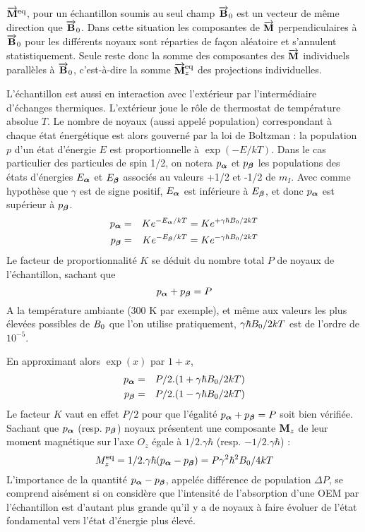 $\overrightarrow{\mathbf{M}}^{\mbox{\footnotesize{eq}}}$, pour un échantillon soumis
au seul champ $\overrightarrow{\mathbf{B}}_0$ est un vecteur de même
direction que $\overrightarrow{\mathbf{B}}_0$.
Dans cette situation les composantes de $\overrightarrow{\mathbf{M}}$
perpendiculaires à $\overrightarrow{\mathbf{B}}_0$ pour
les différents noyaux sont réparties de façon aléatoire et s'annulent statistiquement.
Seule reste donc la somme des composantes des $\overrightarrow{\mathbf{M}}$
individuels parallèles à $\overrightarrow{\mathbf{B}}_0$,
c'est-à-dire la somme $\overrightarrow{\mathbf{M}}^{\mbox{\footnotesize{eq}}}_z$ des projections individuelles.

L'échantillon est aussi en interaction avec l'extérieur par l'intermédiaire
d'échanges thermiques.
L'extérieur joue le rôle de thermostat de température absolue $T$.
Le nombre de noyaux (aussi appelé population) correspondant à chaque état
énergétique est alors gouverné par la loi de Boltzman :
la population $p$ d'un état d'énergie $E$ est proportionnelle à $\exp(-E/kT)$.
Dans le cas particulier des particules de spin 1/2,
on notera $p_{\boldsymbol{\alpha}}$ et $p_{\boldsymbol{\beta}}$ les populations des états d'énergies
$E_{\boldsymbol{\alpha}}$ et $E_{\boldsymbol{\beta}}$ associés au valeurs +1/2 et -1/2 de $m_I$.
\label{page:population}
Avec comme hypothèse que $\gamma$ est de signe positif,
$E_{\boldsymbol{\alpha}}$ est inférieure à $E_{\boldsymbol{\beta}}$, et donc $p_{\boldsymbol{\alpha}}$ est supérieur à $p_{\boldsymbol{\beta}}$.
\begin{eqnarray}
p_{\boldsymbol{\alpha}} & = & K e^{-E_{\boldsymbol{\alpha}}/kT} = K e^{+\gamma \hbar B_0/2kT} \\
p_{\boldsymbol{\beta}} & = & K e^{-E_{\boldsymbol{\beta}}/kT} = K e^{-\gamma \hbar B_0/2kT}
\end{eqnarray}
Le facteur de proportionnalité $K$ se déduit du nombre total $P$ de
noyaux de l'échantillon, sachant que
\begin{equation}
p_{\boldsymbol{\alpha}} + p_{\boldsymbol{\beta}} = P
\end{equation}
A la température ambiante (300 K par exemple), et même aux valeurs les
plus élevées possibles de $B_0$ que l'on utilise pratiquement,
$\gamma \hbar B_0/2kT$ est de l'ordre de $10^{-5}$.

En approximant alors $\exp(x)$ par $1+x$,
\begin{eqnarray}
p_{\boldsymbol{\alpha}} & = & P/2.(1+\gamma \hbar B_0/2kT) \\
p_{\boldsymbol{\beta}} & = & P/2.(1-\gamma \hbar B_0/2kT)
\end{eqnarray}
Le facteur $K$ vaut en effet $P/2$ pour que l'égalité
$p_{\boldsymbol{\alpha}} + p_{\boldsymbol{\beta}} = P$ soit bien vérifiée.
Sachant que $p_{\boldsymbol{\alpha}}$ (resp. $p_{\boldsymbol{\beta}}$) noyaux présentent une composante
$\mathbf{M}_z$ de leur moment magnétique sur l'axe $O_z$
égale à $1/2.\gamma \hbar$ (resp. $-1/2.\gamma \hbar$) :
\begin{equation}
\label{eqn:diffpopgamma}
M^{\mbox{\footnotesize{eq}}}_z = 1/2. \gamma \hbar (p_{\boldsymbol{\alpha}} - p_{\boldsymbol{\beta}}) =
P \gamma^2 \hbar^2 B_0 / 4kT
\end{equation}
L'importance de la quantité $p_{\boldsymbol{\alpha}} - p_{\boldsymbol{\beta}}$, appelée différence de population
$\Delta P$, se comprend aisément si on considère que l'intensité de
l'absorption d'une OEM par l'échantillon est d'autant plus grande
qu'il y a de noyaux à faire évoluer de l'état fondamental vers l'état
d'énergie plus élevé.

